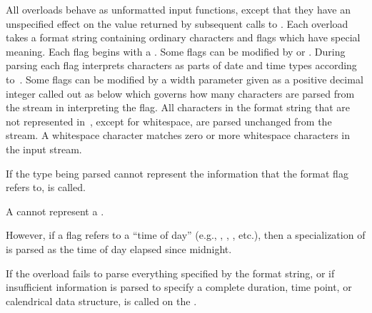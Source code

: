 \pnum
All  overloads behave as unformatted input functions,
except that they have an unspecified effect
on the value returned by subsequent calls to .
Each overload takes a format string containing ordinary characters
and flags which have special meaning.
Each flag begins with a \tcode{\%}.
Some flags can be modified by  or .
During parsing each flag interprets characters as parts of date and time types
according to~.
Some flags can be modified by a width parameter
given as a positive decimal integer called out as  below
which governs how many characters are parsed from the stream in interpreting the flag.
All characters in the format string that are not represented in~,
except for whitespace, are parsed unchanged from the stream.
A whitespace character matches zero or more whitespace characters in the input stream.

\pnum
If the type being parsed cannot represent
the information that the format flag refers to,
 is called.
\begin{example}
A  cannot represent a .
\end{example}
However, if a flag refers to a ``time of day''
(e.g., , , , etc.),
then a specialization of  is parsed as
the time of day elapsed since midnight.

\pnum
If the  overload fails to parse
everything specified by the format string,
or if insufficient information is parsed to specify a complete
duration, time point, or calendrical data structure,
is called on the .


